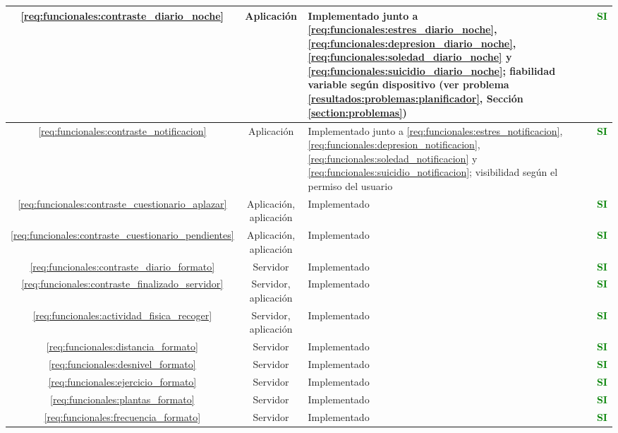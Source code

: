 \begin{xltabular}{\textwidth}{|c|c|X|c|}
        \hline
        \ref{req:funcionales:contraste_diario_noche} & Aplicación & Implementado junto a \ref{req:funcionales:estres_diario_noche},
        \ref{req:funcionales:depresion_diario_noche}, \ref{req:funcionales:soledad_diario_noche} y   \ref{req:funcionales:suicidio_diario_noche}; fiabilidad variable según dispositivo (ver problema \ref{resultados:problemas:planificador}, Sección \ref{section:problemas}) & \textcolor{green}{\textbf{SI}} \\
        \hline
        \ref{req:funcionales:contraste_notificacion} & Aplicación & Implementado junto a \ref{req:funcionales:estres_notificacion}, \ref{req:funcionales:depresion_notificacion}, \ref{req:funcionales:soledad_notificacion} y \ref{req:funcionales:suicidio_notificacion}; visibilidad según el permiso del usuario & \textcolor{green}{\textbf{SI}} \\
        \hline
        \ref{req:funcionales:contraste_cuestionario_aplazar} & Aplicación, aplicación & Implementado & \textcolor{green}{\textbf{SI}} \\
        \hline
        \ref{req:funcionales:contraste_cuestionario_pendientes} & Aplicación, aplicación & Implementado & \textcolor{green}{\textbf{SI}} \\
        \hline
        \ref{req:funcionales:contraste_diario_formato} & Servidor & Implementado & \textcolor{green}{\textbf{SI}} \\
        \hline
        \ref{req:funcionales:contraste_finalizado_servidor} & Servidor, aplicación & Implementado & \textcolor{green}{\textbf{SI}} \\
        \hline
        \ref{req:funcionales:actividad_fisica_recoger} & Servidor, aplicación & Implementado & \textcolor{green}{\textbf{SI}} \\
        \hline
        \ref{req:funcionales:distancia_formato} & Servidor & Implementado & \textcolor{green}{\textbf{SI}} \\
        \hline
        \ref{req:funcionales:desnivel_formato} & Servidor & Implementado & \textcolor{green}{\textbf{SI}} \\
        \hline
        \ref{req:funcionales:ejercicio_formato} & Servidor & Implementado & \textcolor{green}{\textbf{SI}} \\
        \hline
        \ref{req:funcionales:plantas_formato} & Servidor & Implementado & \textcolor{green}{\textbf{SI}} \\
        \hline
        \ref{req:funcionales:frecuencia_formato} & Servidor & Implementado & \textcolor{green}{\textbf{SI}} \\

\end{xltabular}
